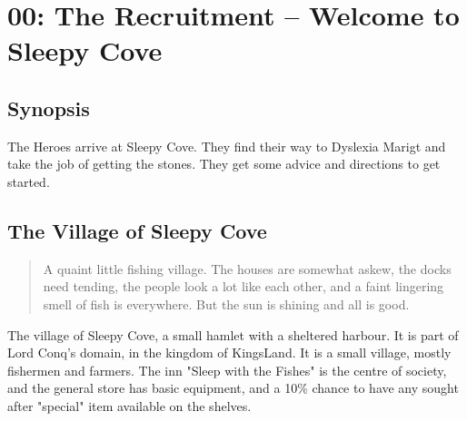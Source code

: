 \documentclass[11pt, twoside, titlepage, a4paper]{report}
\renewcommand{\chaptermark}[1]{\markboth{#1}{}}
\newenvironment{readoutloud}%
{\begin{quote}\begin{itshape}}%
{\end{itshape}\end{quote}}%
\begin{document}
\clearpage
{}
\section*{00: The Recruitment -- Welcome to Sleepy Cove}
\chaptermark{sleepy cove}


\subsection*{Synopsis}
The Heroes arrive at Sleepy Cove. They find their way to Dyslexia Marigt and take the job of getting the stones. They get some advice and directions to get started.


\subsection*{The Village of Sleepy Cove}
\begin{readoutloud}
A quaint little fishing village. The houses are somewhat askew, the docks need tending, the people look a lot like each other, and a faint lingering smell of fish is everywhere. But the sun is shining and all is good.
\end{readoutloud}

The village of Sleepy Cove, a small hamlet with a sheltered harbour. It is part of Lord Conq's domain, in the kingdom of KingsLand. It is a small village, mostly fishermen and farmers. The inn "Sleep with the Fishes" is the centre of society, and the general store has basic equipment, and a 10\% chance to have any sought after "special" item available on the shelves.
\end{document}
